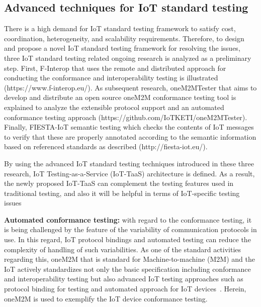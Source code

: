 \subsection{Advanced techniques for IoT standard testing}
There is a high demand for IoT standard testing framework to satisfy cost, coordination, heterogeneity, and scalability requirements. Therefore, to design and propose a novel IoT standard testing framework for resolving the issues, three IoT standard testing related ongoing research is analyzed as a preliminary step. First, F-Interop that uses the remote and distributed approach for conducting the conformance and interoperability testing is illustrated (https://www.f-interop.eu/). As subsequent research, oneM2MTester that aims to develop and distribute an open source oneM2M conformance testing tool is explained to analyze the extensible protocol support and an automated conformance testing approach (https://github.com/IoTKETI/oneM2MTester). Finally, FIESTA-IoT semantic testing which checks the contents of IoT messages to verify that these are properly annotated according to the semantic information based on referenced standards as described (http://fiesta-iot.eu/).

By using the advanced IoT standard testing techniques introduced in these three research, IoT Testing-as-a-Service (IoT-TaaS) architecture is defined. As a result, the newly proposed IoT-TaaS can complement the testing features used in traditional testing, and also it will be helpful in terms of IoT-specific testing issues

\textbf{Automated conformance testing:} with regard to the conformance testing, it is being challenged by the feature of the variability of communication protocols in use. In this regard, IoT protocol bindings and automated testing can reduce the complexity of handling of such variabilities. As one of the standard activities regarding this, oneM2M that is standard for Machine-to-machine (M2M) and the IoT actively standardizes not only the basic specification including conformance and interoperability testing but also advanced IoT testing approaches such as protocol binding for testing and automated approach for IoT devices~\cite{ts0015}. Herein, oneM2M is used to exemplify the IoT device conformance testing.

